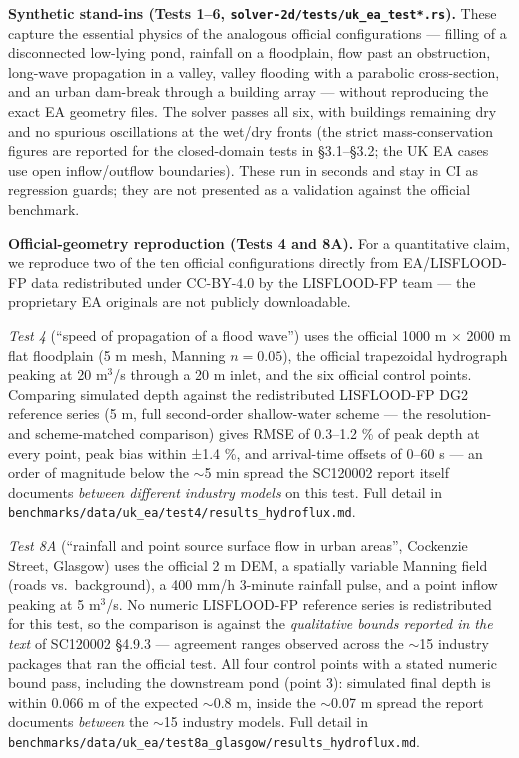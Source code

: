 \textbf{Synthetic stand-ins (Tests 1--6,
\texttt{solver-2d/tests/uk\_ea\_test*.rs}).} These capture the essential
physics of the analogous official configurations --- filling of a
disconnected low-lying pond, rainfall on a floodplain, flow past an
obstruction, long-wave propagation in a valley, valley flooding with a
parabolic cross-section, and an urban dam-break through a building array
--- without reproducing the exact EA geometry files. The solver passes
all six, with buildings remaining dry and no spurious oscillations at
the wet/dry fronts (the strict mass-conservation figures are reported
for the closed-domain tests in §3.1--§3.2; the UK EA cases use open
inflow/outflow boundaries). These run in seconds and stay in CI as
regression guards; they are not presented as a validation against the
official benchmark.

\textbf{Official-geometry reproduction (Tests 4 and 8A).} For a
quantitative claim, we reproduce two of the ten official configurations
directly from EA/LISFLOOD-FP data redistributed under CC-BY-4.0 by the
LISFLOOD-FP team \citep{Shaw2021, Sharifian2023} --- the proprietary EA
originals are not publicly downloadable.

\emph{Test 4} (``speed of propagation of a flood wave'') uses the
official 1000 m × 2000 m flat floodplain (5 m mesh, Manning \(n=0.05\)),
the official trapezoidal hydrograph peaking at 20 m$^{3}$/s through a 20 m
inlet, and the six official control points. Comparing simulated depth
against the redistributed LISFLOOD-FP DG2 reference series (5 m, full
second-order shallow-water scheme --- the resolution- and scheme-matched
comparison) gives RMSE of 0.3--1.2 \% of peak depth at every point, peak
bias within ±1.4 \%, and arrival-time offsets of 0--60 s --- an order of
magnitude below the $\sim$5 min spread the SC120002 report
itself documents \emph{between different industry models} on this test.
Full detail in
\texttt{benchmarks/data/uk\_ea/test4/results\_hydroflux.md}.

\emph{Test 8A} (``rainfall and point source surface flow in urban
areas'', Cockenzie Street, Glasgow) uses the official 2 m DEM, a
spatially variable Manning field (roads vs.~background), a 400 mm/h
3-minute rainfall pulse, and a point inflow peaking at 5 m$^{3}$/s. No
numeric LISFLOOD-FP reference series is redistributed for this test, so
the comparison is against the \emph{qualitative bounds reported in the
text} of SC120002 §4.9.3 --- agreement ranges observed across the
$\sim$15 industry packages that ran the official test. All four
control points with a stated numeric bound pass, including the
downstream pond (point 3): simulated final depth is within 0.066 m of
the expected $\sim$0.8 m, inside the $\sim$0.07 m
spread the report documents \emph{between} the $\sim$15
industry models. Full detail in
\texttt{benchmarks/data/uk\_ea/test8a\_glasgow/results\_hydroflux.md}.

